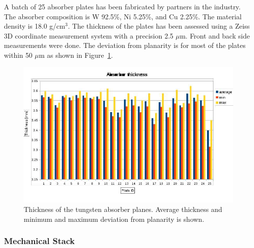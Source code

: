 A batch of 25 absorber plates has been fabricated by partners in the industry. 
The absorber composition is W 92.5\%, Ni 5.25\%, and Cu 2.25\%.
The material density is 18.0 g/cm$^3$. The thickness of the plates has been assessed using a Zeiss 3D coordinate
measurement system with a precision 2.5 $\mu$m. Front and back side measurements were done. The deviation
from planarity is for most of the plates within 50 $\mu$m as shown in Figure~\ref{fig:tungsten}.
\begin{figure}[hbp]
  \centering
   \includegraphics[width=0.9\columnwidth]{Calorimeter/FCAL/figs/tungsten_disk_thickness.jpeg} 
   \caption{Thickness of the tungsten absorber planes. Average thickness and minimum and maximum deviation from planarity is shown.}
  \label{fig:tungsten}
\end{figure}

\subsubsection{Mechanical Stack}

